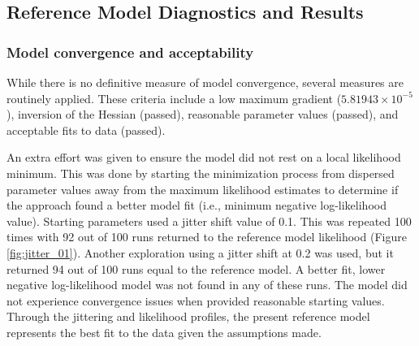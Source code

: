 \documentclass[11pt,
  english,
  a4paper,
]{article}
\begin{document}
\leavevmode\tagmcend\tagstructend\par


\hypertarget{reference-model-diagnostics-and-results}{%
\subsection{Reference Model Diagnostics and Results}\label{reference-model-diagnostics-and-results}}

\leavevmode\tagmcend\tagstructend


\hypertarget{model-convergence-and-acceptability}{%
\subsubsection{Model convergence and acceptability}\label{model-convergence-and-acceptability}}

\leavevmode\tagmcend\tagstructend


While there is no definitive measure of model convergence, several measures are routinely applied. These criteria include a low maximum gradient (\ensuremath{5.81943\times 10^{-5}}), inversion of the Hessian (passed), reasonable parameter values (passed), and acceptable fits to data (passed).

\leavevmode\tagmcend\tagstructend\par


An extra effort was given to ensure the model did not rest on a local likelihood minimum. This was done by starting the minimization process from dispersed parameter values away from the maximum likelihood estimates to determine if the approach found a better model fit (i.e., minimum negative log-likelihood value). Starting parameters used a jitter shift value of 0.1. This was repeated 100 times with 92 out of 100 runs returned to the reference model likelihood (Figure \ref{fig:jitter_01}). Another exploration using a jitter shift at 0.2 was used, but it returned 94 out of 100 runs equal to the reference model. A better fit, lower negative log-likelihood model was not found in any of these runs. The model did not experience convergence issues when provided reasonable starting values. Through the jittering and likelihood profiles, the present reference model represents the best fit to the data given the assumptions made.
\end{document}
